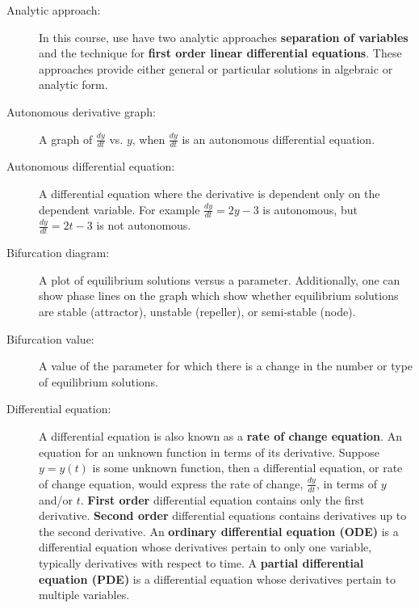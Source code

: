 \pagestyle{fancy}
\setcounter{page}{1}
\lfoot{}
\cfoot{}
\renewcommand{\footrulewidth}{.4pt}
\vspace*{-20pt} \thispagestyle{firstfooter}
\begin{description}
\item[Analytic approach:] In this course, use have two analytic approaches \textbf{separation of variables} and the technique for \textbf{first order linear differential equations}. These approaches provide either general or particular solutions in algebraic or analytic form.
\item[Autonomous derivative graph:] A graph of $\frac{dy}{dt}$ vs. $y$, when $\frac{dy}{dt}$ is an autonomous differential equation.
\item[Autonomous differential equation:] A differential equation where the derivative is dependent only on the dependent variable. For example $\frac{dy}{dt}=2y-3$ is autonomous, but $\frac{dy}{dt} = 2t -3$ is not autonomous. 
\item[Bifurcation diagram:] A plot of equilibrium solutions versus a parameter. Additionally, one can show phase lines on the graph which show whether equilibrium solutions are stable (attractor), unstable (repeller), or semi-stable (node).
\item[Bifurcation value:] A value of the parameter for which there is a change in the number or type of equilibrium solutions.
\item[Differential equation:] A differential equation is also known as a \textbf{rate of change equation}. An equation for an unknown function in terms of its derivative. Suppose $y = y(t)$ is some unknown function, then a differential equation, or rate of change equation, would express the rate of change, $\frac{dy}{dt}$, in terms of $y$ and/or $t$. \textbf{First order} differential equation contains only the first derivative. \textbf{Second order} differential equations contains derivatives up to the second derivative. An \textbf{ordinary differential equation (ODE)} is a differential equation whose derivatives pertain to only one variable, typically derivatives with respect to time. A \textbf{partial differential equation (PDE)} is a differential equation whose derivatives pertain to multiple variables.

\end{description}
